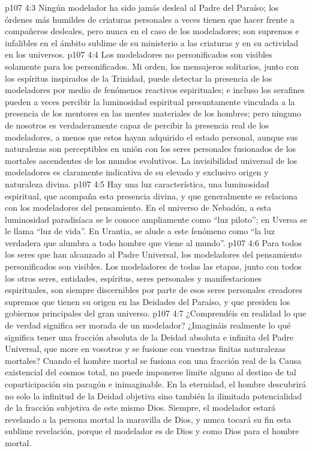 \vs p107 4:3 Ningún modelador ha sido jamás desleal al Padre del Paraíso; los órdenes más humildes de criaturas personales a veces tienen que hacer frente a compañeros desleales, pero nunca en el caso de los modeladores; son supremos e infalibles en el ámbito sublime de su ministerio a las criaturas y en su actividad en los universos.
\vs p107 4:4 \pc Los modeladores no personificados son visibles solamente para los personificados. Mi orden, los mensajeros solitarios, junto con los espíritus inspirados de la Trinidad, puede detectar la presencia de los modeladores por medio de fenómenos reactivos espirituales; e incluso los serafines pueden a veces percibir la luminosidad espiritual presuntamente vinculada a la presencia de los mentores en las mentes materiales de los hombres; pero ninguno de nosotros es verdaderamente capaz de percibir la presencia real de los modeladores, a menos que estos hayan adquirido el estado personal, aunque sus naturalezas son perceptibles en unión con los seres personales fusionados de los mortales ascendentes de los mundos evolutivos. La invisibilidad universal de los modeladores es claramente indicativa de su elevado y exclusivo origen y naturaleza divina.
\vs p107 4:5 Hay una luz característica, una luminosidad espiritual, que acompaña esta presencia divina, y que generalmente se relaciona con los modeladores del pensamiento. En el universo de Nebadón, a esta luminosidad paradisíaca se le conoce ampliamente como “luz piloto”; en Uversa se le llama “luz de vida”. En Urantia, se alude a este fenómeno como “la luz verdadera que alumbra a todo hombre que viene al mundo”.
\vs p107 4:6 Para todos los seres que han alcanzado al Padre Universal, los modeladores del pensamiento personificados son visibles. Los modeladores de todas las etapas, junto con todos los otros seres, entidades, espíritus, seres personales y manifestaciones espirituales, son siempre discernibles por parte de esos seres personales creadores supremos que tienen su origen en las Deidades del Paraíso, y que presiden los gobiernos principales del gran universo.
\vs p107 4:7 \pc ¿Comprendéis en realidad lo que de verdad significa ser morada de un modelador? ¿Imagináis realmente lo qué significa tener una fracción absoluta de la Deidad absoluta e infinita del Padre Universal, que more en vosotros y se fusione con vuestras finitas naturalezas mortales? Cuando el hombre mortal se fusiona con una fracción real de la Causa existencial del cosmos total, no puede imponerse límite alguno al destino de tal coparticipación sin paragón e inimaginable. En la eternidad, el hombre descubrirá no solo la infinitud de la Deidad objetiva sino también la ilimitada potencialidad de la fracción subjetiva de este mismo Dios. Siempre, el modelador estará revelando a la persona mortal la maravilla de Dios, y nunca tocará su fin esta sublime revelación, porque el modelador es de Dios y como Dios para el hombre mortal.
